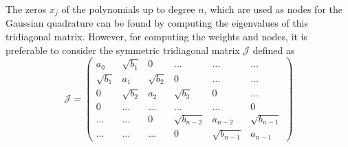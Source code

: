 The zeros $x_j$ of the polynomials up to degree $n$, which are used as nodes for the Gaussian quadrature can be found by computing the eigenvalues of this tridiagonal matrix. However, for computing the weights and nodes, it is preferable to consider the symmetric tridiagonal matrix $\mathcal{J}$ defined as
\begin{equation}
    \mathcal{J}=\begin{pmatrix}
        a_0 &      \sqrt{b_1} &      0 &  \ldots &  \ldots &  \ldots \\
        \sqrt{b_1} &    a_1 &      \sqrt{b_2} &       0 &  \ldots &  \ldots \\
          0 &    \sqrt{b_2} &    a_2 &  \sqrt{b_3} &       0 &  \ldots \\
          0 & \ldots & \ldots &  \ldots &  \ldots &       0 \\
     \ldots & \ldots &      0 & \sqrt{b_{n-2}} & a_{n-2} &       \sqrt{b_{n-1}} \\
     \ldots & \ldots & \ldots &       0 & \sqrt{b_{n-1}} & a_{n-1}
   \end{pmatrix}
\end{equation}